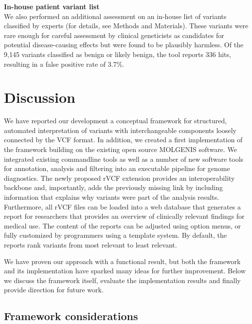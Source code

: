 \noindent\textbf{In-house patient variant list}\\
We also performed an additional assessment on an in-house list of variants classified by experts (for details, see Methods and Materials).
These variants were rare enough for careful assessment by clinical geneticists as candidates for potential disease-causing effects but were found to be plausibly harmless.
Of the 9,145 variants classified as benign or likely benign, the tool reports 336 hits, resulting in a false positive rate of 3.7\%.


\section{Discussion}

We have reported our development a conceptual framework for structured, automated interpretation of variants with interchangeable components loosely connected by the VCF format.
In addition, we created a first implementation of the framework building on the existing open source MOLGENIS software.
We integrated existing commandline tools as well as a number of new software tools for annotation, analysis and filtering into an executable pipeline for genome diagnostics.
The newly proposed rVCF extension provides an interoperability backbone and, importantly, adds the previously missing link by including information that explains why variants were part of the analysis results.
Furthermore, all rVCF files can be loaded into a web database that generates a report for researchers that provides an overview of clinically relevant findings for medical use.
The content of the reports can be adjusted using option menus, or fully customized by programmers using a template system.
By default, the reports rank variants from most relevant to least relevant.

We have proven our approach with a functional result, but both the framework and its implementation have sparked many ideas for further improvement.
Below we discuss the framework itself, evaluate the implementation results and finally provide direction for future work.

\subsection{Framework considerations}

